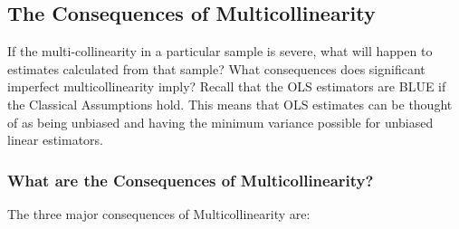 \documentclass[11pt]{article}
\begin{document}
\subsection{The Consequences of Multicollinearity}
If the multi-collinearity in a particular sample is severe, what will happen to estimates calculated from that sample? What consequences does significant imperfect multicollinearity imply? Recall that the OLS estimators are BLUE if the Classical Assumptions hold. This means that OLS estimates can be thought of as being unbiased and having the minimum variance possible for unbiased linear estimators.
\subsubsection{What are the Consequences of Multicollinearity?}
The three major consequences of Multicollinearity are:
\end{document}
